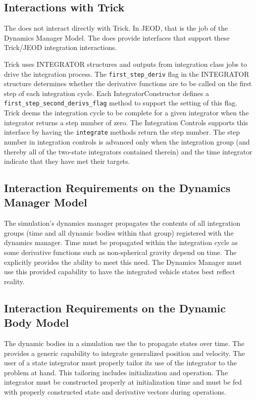 \subsection{Interactions with Trick}
The \ModelDesc does not interact directly with Trick. In JEOD, that
is the job of the Dynamics Manager Model. The \ModelDesc does
provide interfaces that support these Trick/JEOD integration interactions.

Trick uses INTEGRATOR structures and outputs from integration
class jobs to drive the integration process. The \verb+first_step_deriv+
flag in the INTEGRATOR structure determines whether the derivative
functions are to be called on the first step of each integration cycle.
Each IntegratorConstructor defines a \verb+first_step_second_derivs_flag+
method to support the setting of this flag. Trick deems the integration
cycle to be complete for a given integrator when the integrator returns
a step number of zero. The Integration Controls supports this interface by 
having the \verb+integrate+ methods return
the step number.  The step number in integration controls is advanced only when 
the integration group (and thereby all of the two-state integrators contained 
therein) and the time integrator indicate that they have met their targets.

\subsection{Interaction Requirements on the Dynamics Manager Model}
The simulation's dynamics manager propagates the contents of all integration 
groups (time and all dynamic bodies within that group) registered with the 
dynamics manager.
Time must be propagated within the integration cycle as some derivative
functions such as non-spherical gravity depend on time.
The \ModelDesc explicitly provides the ability to meet this need.
The Dynamics Manager must use this provided capability to have the
integrated vehicle states best reflect reality.


\subsection{Interaction Requirements on the Dynamic Body Model}
The dynamic bodies in a simulation use the \ModelDesc to propagate states
over time. The \ModelDesc provides a generic capability to integrate generalized
position and velocity. The user of a state integrator must properly tailor
its use of the integrator to the problem at hand. This tailoring includes
initialization and operation. The integrator must be constructed properly
at initialization time and must be fed with properly constructed state
and derivative vectors during operations.
